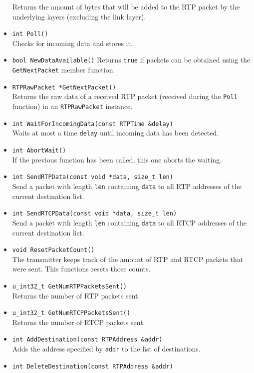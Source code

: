 \documentclass[12pt,a4paper]{article}
\begin{document}
\begin{itemize}
						Returns the amount of bytes that will be added to the RTP packet
						by the underlying layers (excluding the link layer).
					\item {\tt int Poll()}\\
						Checks for incoming data and stores it.
					\item {\tt bool NewDataAvailable()}
						Returns {\tt true} if packets can be obtained using the
						{\tt GetNextPacket} member function.
					\item {\tt RTPRawPacket *GetNextPacket()}\\
						Returns the raw data of a received RTP packet (received during
						the {\tt Poll} function) in an {\tt RTPRawPacket} instance.
					\item {\tt int WaitForIncomingData(const RTPTime \&delay)}\\
						Waits at most a time {\tt delay} until incoming data has
						been detected.
					\item {\tt int AbortWait()}\\
						If the previous function has been called, this one aborts
						the waiting.
					\item {\tt int SendRTPData(const void *data, size\_t len)}\\
						Send a packet with length {\tt len} containing {\tt data}
						to all RTP addresses of the current destination list.
					\item {\tt int SendRTCPData(const void *data, size\_t len)}\\
						Send a packet with length {\tt len} containing {\tt data}
						to all RTCP addresses of the current destination list.
					\item {\tt void ResetPacketCount()}\\
						The transmitter keeps track of the amount of RTP and RTCP 
						packets that were sent. This functions resets those counts.
					\item {\tt u\_int32\_t GetNumRTPPacketsSent()}\\
						Returns the number of RTP packets sent.
					\item {\tt u\_int32\_t GetNumRTCPPacketsSent()}\\
						Returns the number of RTCP packets sent.
					\item {\tt int AddDestination(const RTPAddress \&addr)}\\
						Adds the address specified by {\tt addr} to the list of
						destinations.
					\item {\tt int DeleteDestination(const RTPAddress \&addr)}\\

\end{itemize}
\end{document}
